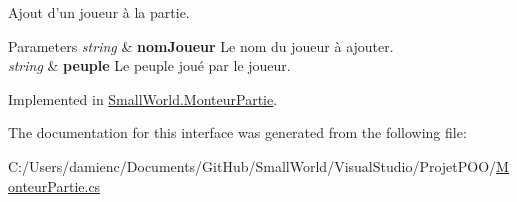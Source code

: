 Ajout d'un joueur à la partie. 


\begin{DoxyParams}{Parameters}
{\em string} & {\bfseries nom\-Joueur} Le nom du joueur à ajouter. \\
\hline
{\em string} & {\bfseries peuple} Le peuple joué par le joueur. \\
\hline
\end{DoxyParams}


Implemented in \hyperlink{class_small_world_1_1_monteur_partie_a4b08bbb3c398ac0f1e1fa49510df20bc}{Small\-World.\-Monteur\-Partie}.



The documentation for this interface was generated from the following file\-:\begin{DoxyCompactItemize}
\item 
C\-:/\-Users/damienc/\-Documents/\-Git\-Hub/\-Small\-World/\-Visual\-Studio/\-Projet\-P\-O\-O/\hyperlink{_monteur_partie_8cs}{Monteur\-Partie.\-cs}\end{DoxyCompactItemize}
